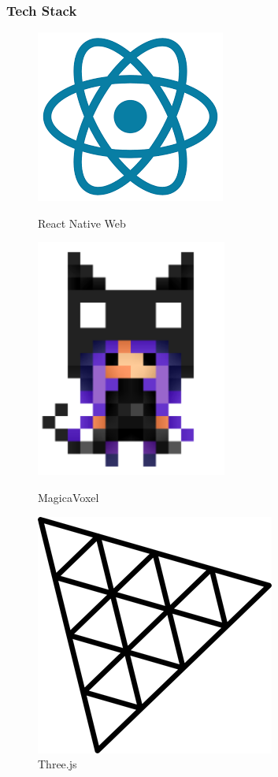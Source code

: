 \documentclass[13.5pt,aspecratio=169, xcolor=dvipsnames]{beamer}
\begin{document}
    \begin{frame}
        \onehalfspacing
        \frametitle{Tech Stack}

        \begin{figure}[h]
            \begin{minipage}{0.32\textwidth}
                \centering
                {\includegraphics[height=0.4\textheight]{Icons/react_native_web.png}}
                \caption{React Native Web}
            \end{minipage}
            \begin{minipage}{0.32\textwidth}
                \centering
                \includegraphics[height=0.4\textheight]{Icons/MagicaVoxel.png}
                \caption{MagicaVoxel}
            \end{minipage}
            \begin{minipage}{0.32\textwidth}
                \centering
                \includegraphics[height=0.4\textheight]{Icons/three-js-logo-07A32307F1-seeklogo.com.png}
                \caption{Three.js}
            \end{minipage}
        \end{figure}


\end{frame}
\end{document}
